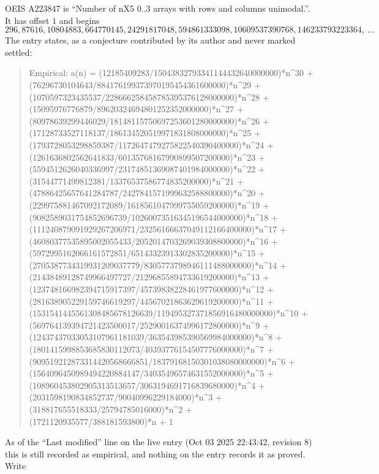 \documentclass[11pt,a4paper]{article}
\theoremstyle{plain}
\theoremstyle{definition}
\begin{document}
OEIS A223847 is ``Number of nX5 0..3 arrays with rows and columns unimodal.''. It has offset $1$ and begins
\[
296, 87616, 10804883, 664770145, 24291817048, 594861333098, 10609537390768, 146233793223364,\ \dots
\]
The entry states, as a conjecture contributed by its author and never marked settled:
\begin{quote}\raggedright\small
Empirical: a(n) = (12185409283/15043832793341144432640000000)*n\^{}30 + (76296730104643/884176199373970195454361600000)*n\^{}29 + (1070597323435537/228666258458785395376128000000)*n\^{}28 + (15095976776879/89620324694801252352000000)*n\^{}27 + (80978639299446029/18148115750697253601280000000)*n\^{}26 + (17128733527118137/186134520519971831808000000)*n\^{}25 + (1793728053298859387/1172647479275822540390400000)*n\^{}24 + (1261636802562641833/60135768167990899507200000)*n\^{}23 + (5594512626040336997/23174851369087401984000000)*n\^{}22 + (31544771499812381/13376537586774835200000)*n\^{}21 + (47886425657641284787/2427841571999632588800000)*n\^{}20 + (229975881467092172089/1618561047999755059200000)*n\^{}19 + (9082589031754852696739/10260073516345196544000000)*n\^{}18 + (111240879091929267206971/23256166637049112166400000)*n\^{}17 + (46080377535895002055433/2052014703269039308800000)*n\^{}16 + (5972995162066161572851/65143323913302835200000)*n\^{}15 + (2705387734319931209037779/8305773798946111488000000)*n\^{}14 + (21438489128749966497727/21296855894733619200000)*n\^{}13 + (123748166982394715917397/45739838228461977600000)*n\^{}12 + (281638905229159746619297/44567021863629619200000)*n\^{}11 + (1531541445561308485678126639/119495327371856916480000000)*n\^{}10 + (569764139394721423500017/25290016374996172800000)*n\^{}9 + (12437437033053107961181039/363543985390569984000000)*n\^{}8 + (1801415998853685830112073/40393776154507776000000)*n\^{}7 + (909519212873314420568666851/18379168150301038080000000)*n\^{}6 + (1564096450989494220884147/34035496574631552000000)*n\^{}5 + (108960453802905313513657/3063194691716839680000)*n\^{}4 + (2031598190834852737/90040996229184000)*n\^{}3 + (318817655518333/25794785016000)*n\^{}2 + (1721120935577/388181593800)*n + 1
\end{quote}
As of the ``Last modified'' line on the live entry (Oct 03 2025 22:43:42, revision 8) this is still
recorded as empirical, and nothing on the entry records it as proved. Write
\end{document}
